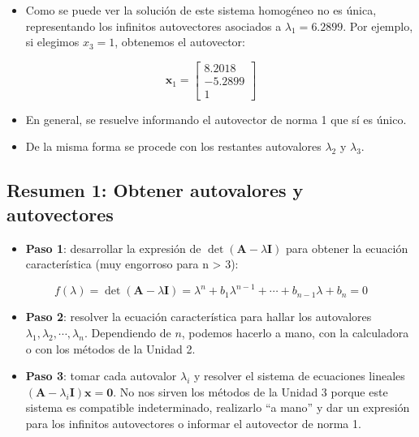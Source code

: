 \documentclass[openany]{book}
\providecommand{\tightlist}{%
  \setlength{\itemsep}{0pt}\setlength{\parskip}{0pt}}
\begin{document}
\begin{itemize}
\tightlist
\item
  Como se puede ver la solución de este sistema homogéneo no es única, representando los infinitos autovectores asociados a \(\lambda_1 = 6.2899\). Por ejemplo, si elegimos \(x_3 = 1\), obtenemos el autovector:
\end{itemize}

\[
\textbf{x}_1 = 
\begin{bmatrix}
    8.2018 \\ -5.2899 \\ 1
\end{bmatrix} 
\]

\begin{itemize}
\tightlist
\item
  En general, se resuelve informando el autovector de norma 1 que sí es único.
\item
  De la misma forma se procede con los restantes autovalores \(\lambda_2\) y \(\lambda_3\).
\end{itemize}

\hypertarget{resumen-1-obtener-autovalores-y-autovectores}{%
\subsection*{Resumen 1: Obtener autovalores y autovectores}\label{resumen-1-obtener-autovalores-y-autovectores}}

\begin{itemize}
\tightlist
\item
  \textbf{Paso 1}: desarrollar la expresión de \(\det(\textbf{A} - \lambda \textbf{I})\) para obtener la ecuación característica (muy engorroso para n \textgreater{} 3):
\end{itemize}

\[
f(\lambda) = \det(\textbf{A} - \lambda \textbf{I}) = \lambda^n + b_1 \lambda^{n-1} + \cdots + b_{n-1} \lambda + b_n = 0
\]

\begin{itemize}
\item
  \textbf{Paso 2}: resolver la ecuación característica para hallar los autovalores \(\lambda_1, \lambda_2, \cdots, \lambda_n\). Dependiendo de \(n\), podemos hacerlo a mano, con la calculadora o con los métodos de la Unidad 2.
\item
  \textbf{Paso 3}: tomar cada autovalor \(\lambda_i\) y resolver el sistema de ecuaciones lineales \((\textbf{A} - \lambda_i \textbf{I}) \textbf{x} = \textbf{0}\). No nos sirven los métodos de la Unidad 3 porque este sistema es compatible indeterminado, realizarlo ``a mano'' y dar un expresión para los infinitos autovectores o informar el autovector de norma 1.
\end{itemize}
\end{document}

